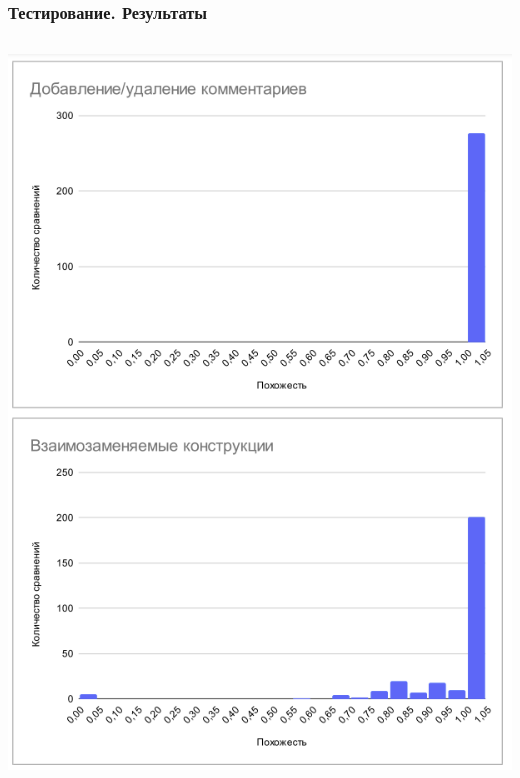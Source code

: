 \documentclass[10pt]{beamer}
\begin{document}
\begin{frame}\frametitle{Тестирование. Результаты}
	\begin{columns}[C]
	\centering
	\includegraphics[scale=0.25]{res.png}
	

\end{columns}
\end{frame}
\end{document}
